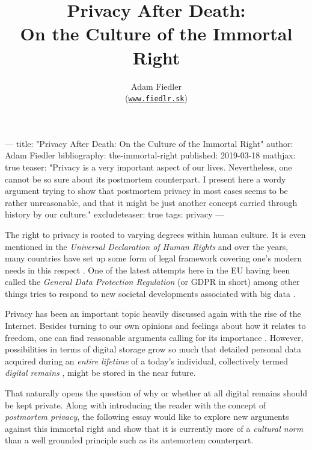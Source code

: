 ---
title: "Privacy After Death: On the Culture of the Immortal Right"
author: Adam Fiedler
bibliography: the-immortal-right
published: 2019-03-18
mathjax: true
teaser: "Privacy is a very important aspect of our lives.
Nevertheless, one cannot be so sure about its postmortem counterpart.
I present here a wordy argument trying to show that postmortem privacy in most cases seems to be rather unreasonable,
and that it might be just another concept carried through history by our culture."
excludeteaser: true
tags: privacy
---

\title{
    Privacy After Death:\\
    On the Culture of the Immortal Right
}
\author{
    Adam Fiedler\\
    \small
    (\texttt{\href{http://fiedlr.sk}{www.fiedlr.sk}})
}
\date{}


\maketitle

The right to privacy is rooted to varying degrees within human culture. It is even mentioned in the \textit{Universal Declaration of Human Rights} \cite{udrights} and over the years, many countries have set up some form of legal framework covering one's modern needs in this respect \cite{consumerreport}. One of the latest attempts here in the EU having been called the \textit{General Data Protection Regulation} (or GDPR in short) among other things tries to respond to new societal developments associated with big data \cite{louveaux}.

Privacy has been an important topic heavily discussed again with the rise of the Internet. Besides turning to our own opinions and feelings about how it relates to freedom, one can find reasonable arguments calling for its importance \cite{harbinja2}.
However, possibilities in terms of digital storage grow so much that detailed personal data acquired during an \emph{entire lifetime} of a today's individual, collectively termed \textit{digital remains} \cite{buitelaar}, might be stored in the near future.

That naturally opens the question of why or whether at all digital remains should be kept private. Along with introducing the reader with the concept of \textit{postmortem privacy}, the following essay would like to explore new arguments against this immortal right and show that it is currently more of a \emph{cultural norm} than a well grounded principle such as its antemortem counterpart.

